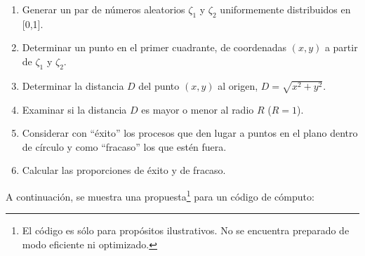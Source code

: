 \begin{enumerate}
 \item Generar un par de n\'umeros aleatorios $\zeta_{1}$ y $\zeta_{2}$ uniformemente distribuidos en [0,1].\\
 
 \item Determinar un punto en el primer cuadrante, de coordenadas $(x, y)$ a partir de $\zeta_{1}$ y $\zeta_{2}$. \\
 
 \item Determinar la distancia $D$ del punto $(x, y)$ al origen, $D = \sqrt{x^{2} + y^{2}}$. \\
 
 \item Examinar si la distancia $D$ es mayor o menor al radio $R$ ($R = 1$). \\
 
 \item Considerar con ``\'exito'' los procesos que den lugar a puntos en el plano dentro de c\'irculo y como ``fracaso'' los que est\'en 
 fuera. \\
 
 \item Calcular las proporciones de \'exito y de fracaso. \\
 
\end{enumerate}

A continuaci\'on, se muestra una propuesta\footnote{El c\'odigo es s\'olo para prop\'ositos ilustrativos. No se encuentra preparado de modo 
eficiente ni optimizado.} para un c\'odigo de c\'omputo:


